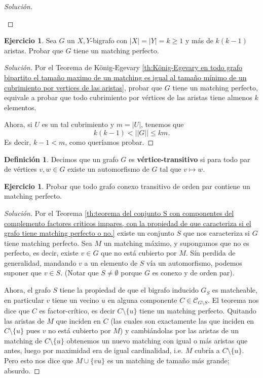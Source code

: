 \documentclass[12pt]{report}
\theoremstyle{plain}
\theoremstyle{definition}
\newtheorem{definition}[theorem]{Definición}
\newtheorem{exercise}[theorem]{Ejercicio}
\newenvironment{solution}{\begin{proof}[Solución]}{\end{proof}}
\newcommand{\abs}[1]{\left \vert #1 \right \vert}
\newcommand{\Abs}[1]{\left \vert \left \vert #1 \right \vert \right \vert}
\begin{document}
\begin{solution}
\begin{enumerate}[(a)]
\end{enumerate}
\end{solution}

\begin{exercise}\label{exercise:matching perfecto de un n-n bigrafo tal que hay mas de n(n-1) aristas}
Sea $G$ un $X,Y$-bigrafo con $\abs X = \abs Y = k \geq 1$ y más de $k(k-1)$ aristas. Probar que $G$ tiene un matching perfecto.
\end{exercise}
\begin{solution}
Por el Teorema de König-Egevary \ref{th:König-Egevary en todo grafo bipartito el tamaño maximo de un matching es igual al tamaño mínimo de un cubrimiento por vertices de las aristas}, probar que $G$ tiene un matching perfecto, equivale a probar que todo cubrimiento por vértices de las aristas tiene almenos $k$ elementos.

Ahora, si $U$ es un tal cubrimiento y $m = \abs U$, tenemos que
\[
    k(k-1) < \Abs G \leq k m.
\]
Es decir, $k-1 < m$, como queríamos probar.
\end{solution}

\begin{definition}
Decimos que un grafo $G$ es \textbf{vértice-transitivo} si para todo par de vértices $v,w\in G$ existe un automorfismo de $G$ tal que $v \mapsto w$.
\end{definition}

\begin{exercise}
Probar que todo grafo conexo transitivo de orden par contiene un matching perfecto.
\end{exercise}
\begin{solution}
Por el Teorema \ref{th:teorema del conjunto S con componentes del complemento factores criticos impares, con la propiedad de que caracteriza si el grafo tiene matching perfecto o no.} existe un conjunto $S$ que nos caracteriza si $G$ tiene matching perfecto. Sea $M$ un matching máximo, y supongamos que no es perfecto, es decir, existe $v \in G$ que no está cubierto por $M$. Sín perdida de generalidad, mandando $v$ a un elemento de $S$ vía un automorfismo, podemos suponer que $v \in S$. (Notar que $S \neq \emptyset$ porque $G$ es conexo y de orden par).

Ahora, el grafo $S$ tiene la propiedad de que el bigrafo inducido $G_S$ es matcheable, en particular $v$ tiene un vecino $u$ en alguna componente $C \in \mathcal C _{G \setminus S}$. El teorema nos dice que $C$ es factor-crítico, es decir $C \setminus \{u\}$ tiene un matching perfecto. Quitando las aristas de $M$ que inciden en $C$ (las cuales son exactamente las que inciden en $C \setminus \{u\}$ pues $v$ no está cubierto por $M$) y cambiándolas por las aristas de un matching de $C \setminus \{u\}$ obtenemos un nuevo matching con igual o más aristas que antes, luego por maximidad era de igual cardinalidad, i.e. $M$ cubría a $C \setminus \{u\}$. Pero esto nos dice que $M \cup \{ v u \}$ es un matching de tamaño más grande; absurdo.
\end{solution}
\end{document}
